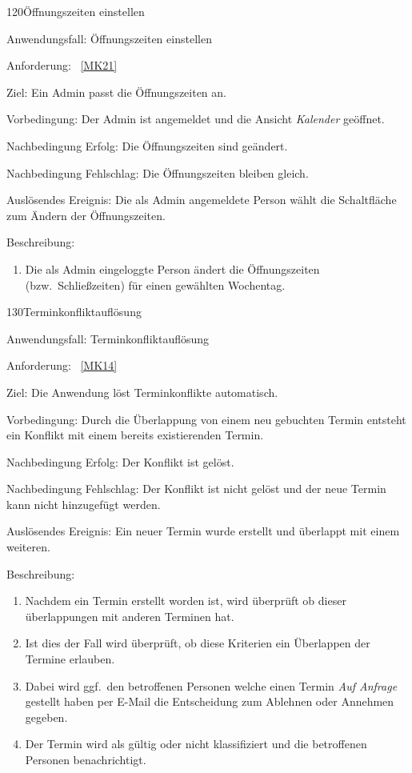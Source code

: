 \pagebreak

\begin{function}{120}{Öffnungszeiten einstellen}
    \item[Anwendungsfall:] Öffnungszeiten einstellen
    \item[Anforderung:]~\ref{MK21}
    \item[Ziel:] Ein Admin passt die Öffnungszeiten an.
    \item[Vorbedingung:] Der Admin ist angemeldet und die Ansicht \textit{Kalender} geöffnet.
    \item[Nachbedingung Erfolg:] Die Öffnungszeiten sind geändert.
    \item[Nachbedingung Fehlschlag:] Die Öffnungszeiten bleiben gleich.
    \item[Auslösendes Ereignis:] Die als Admin angemeldete Person wählt die Schaltfläche zum Ändern der Öffnungszeiten.
    \item[Beschreibung:] ~
    \begin{enumerate}
        \item Die als Admin eingeloggte Person ändert die Öffnungszeiten (bzw.\ Schließzeiten) für einen gewählten Wochentag.
    \end{enumerate}
\end{function}

\pagebreak

\begin{function}{130}{Terminkonfliktauflösung}
    \item[Anwendungsfall:] Terminkonfliktauflösung
    \item[Anforderung:]~\ref{MK14}
    \item[Ziel:] Die Anwendung löst Terminkonflikte automatisch.
    \item[Vorbedingung:] Durch die Überlappung von einem neu gebuchten Termin entsteht ein Konflikt mit einem bereits existierenden Termin.
    \item[Nachbedingung Erfolg:] Der Konflikt ist gelöst.
    \item[Nachbedingung Fehlschlag:] Der Konflikt ist nicht gelöst und der neue Termin kann nicht hinzugefügt werden.
    \item[Auslösendes Ereignis:] Ein neuer Termin wurde erstellt und überlappt mit einem weiteren.
    \item[Beschreibung:] ~
    \begin{enumerate}
        \item Nachdem ein Termin erstellt worden ist, wird überprüft ob dieser überlappungen mit anderen Terminen hat.
        \item Ist dies der Fall wird überprüft, ob diese Kriterien ein Überlappen der Termine erlauben.
        \item Dabei wird ggf.\ den betroffenen Personen welche einen Termin \textit{Auf Anfrage} gestellt haben per E-Mail die Entscheidung zum Ablehnen oder Annehmen gegeben.
        \item Der Termin wird als gültig oder nicht klassifiziert und die betroffenen Personen benachrichtigt.
    \end{enumerate}
\end{function}